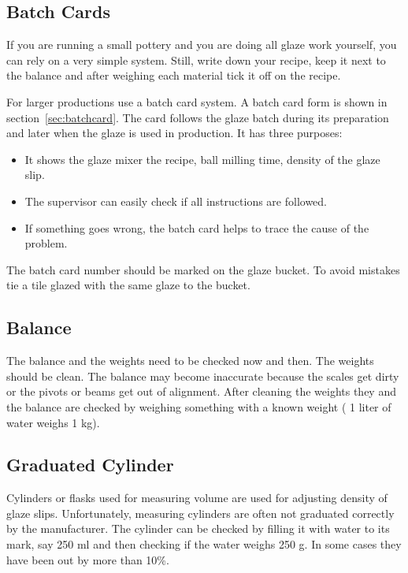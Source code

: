 \subsection{Batch Cards}
If you are running a small pottery and you are doing all glaze work yourself, 
you can rely on a very simple system. Still, write down your recipe, keep it 
next to the balance and after weighing each material tick it off on the recipe.

For larger productions use a batch card system. A batch card form is shown in 
section~\ref{sec:batchcard}. The card follows the glaze batch during its 
preparation and later when the glaze is used in production. It has three 
purposes:
\begin{itemize}
\item It shows the glaze mixer the recipe, ball milling time, density of the 
glaze slip.
\item The supervisor can easily check if all instructions are followed.
\item If something goes wrong, the batch card helps to trace the cause of the 
problem.
\end{itemize}
The batch card number should be marked on the glaze bucket. To avoid mistakes 
tie a tile glazed with the same glaze to the bucket.
\subsection{Balance}
The balance and the weights need to be checked now and then. The weights should 
be clean. The balance may become inaccurate because the scales get dirty or the 
pivots or beams get out of alignment. After cleaning the weights they and the 
balance are checked by weighing something with a known weight ( 1 liter of 
water weighs 1 kg).
\subsection{Graduated Cylinder}
Cylinders or flasks used for measuring volume are used for adjusting density of 
glaze slips. Unfortunately, measuring cylinders are often not graduated 
correctly by the manufacturer. The cylinder can be checked by filling it with 
water to its mark, say 250 ml and then checking if the water weighs 250 g. In 
some cases they have been out by more than 10\%.
